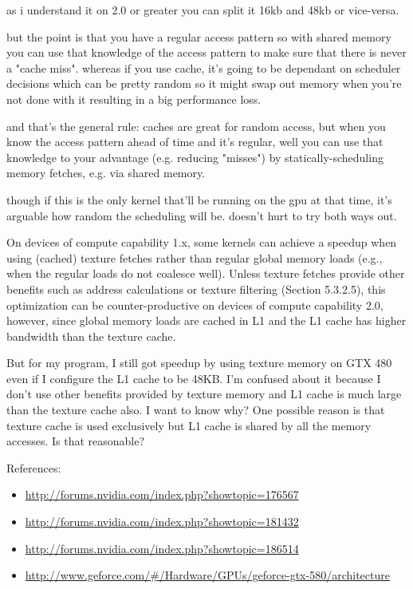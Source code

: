 as i understand it on 2.0 or greater you can split it 16kb and 48kb or
vice-versa.

but the point is that you have a regular access pattern so with shared
memory you can use that knowledge of the access pattern to make sure
that there is never a "cache miss".  whereas if you use cache, it's
going to be dependant on scheduler decisions which can be pretty
random so it might swap out memory when you're not done with it
resulting in a big performance loss.

and that's the general rule: caches are great for random access, but
when you know the access pattern ahead of time and it's regular, well
you can use that knowledge to your advantage (e.g. reducing "misses")
by statically-scheduling memory fetches, e.g. via shared memory.

though if this is the only kernel that'll be running on the gpu at
that time, it's arguable how random the scheduling will be. doesn't
hurt to try both ways out.

On devices of compute capability 1.x, some kernels can achieve a
speedup when using (cached) texture fetches rather than regular global
memory loads (e.g., when the regular loads do not coalesce
well). Unless texture fetches provide other benefits such as address
calculations or texture filtering (Section 5.3.2.5), this optimization
can be counter-productive on devices of compute capability 2.0,
however, since global memory loads are cached in L1 and the L1 cache
has higher bandwidth than the texture cache.


But for my program, I still got speedup by using texture memory on GTX
480 even if I configure the L1 cache to be 48KB. I'm confused about it
because I don't use other benefits provided by texture memory and L1
cache is much large than the texture cache also. I want to know why?
One possible reason is that texture cache is used exclusively but L1
cache is shared by all the memory accesses. Is that reasonable?

References:
\begin{itemize}
\item \url{http://forums.nvidia.com/index.php?showtopic=176567}
\item \url{http://forums.nvidia.com/index.php?showtopic=181432}
\item \url{http://forums.nvidia.com/index.php?showtopic=186514}
\item
  \url{http://www.geforce.com/#/Hardware/GPUs/geforce-gtx-580/architecture} 
\end{itemize}

